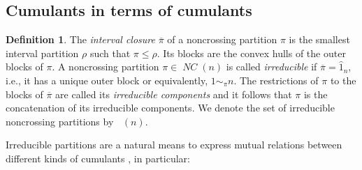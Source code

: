 \documentclass[12pt]{amsart}
\DeclareMathOperator{\NC}{\mathit{NC}} %
\DeclareMathOperator{\NCirr}{{\mathit{NC}^\textit{irr}}} %
\theoremstyle{definition}
\newtheorem{definition}[theorem]{Definition}
\numberwithin{equation}{section}
\begin{document}
\subsection{Cumulants in terms of cumulants}
\begin{definition}
  \label{def:intervalclosure}
  The \emph{interval closure} $\overline{\pi}$ of a noncrossing partition $\pi$
  is the smallest interval partition $\rho$ such that $\pi\leq\rho$.
  Its blocks are  the convex hulls of the outer blocks of $\pi$.
  A noncrossing partition $\pi\in \NC(n)$ is called \emph{irreducible} if
  $\overline{\pi}=\hat{1}_n$, i.e., it has a unique outer block or equivalently,
  $1\sim_\pi n$.
  The restrictions of $\pi$ to the blocks of $\overline{\pi}$
  are called its \emph{irreducible components} and
  it follows that $\pi$ is the concatenation of its irreducible components.
  We denote the set of irreducible noncrossing partitions by
  $\NCirr(n)$.
\end{definition}

Irreducible partitions are a natural means to express mutual relations between
different kinds of cumulants
\cite {Lehner:2002:connected,ArizmendiHasebeLehnerVargas:2015:relations},
in particular:

\vspace{1cm}
\end{document}
